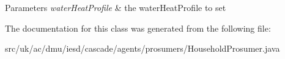 \begin{DoxyParams}{Parameters}
{\em water\-Heat\-Profile} & the water\-Heat\-Profile to set \\
\hline
\end{DoxyParams}


The documentation for this class was generated from the following file\-:\begin{DoxyCompactItemize}
\item 
src/uk/ac/dmu/iesd/cascade/agents/prosumers/Household\-Prosumer.\-java\end{DoxyCompactItemize}
